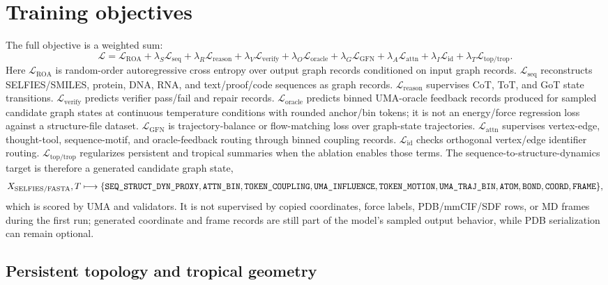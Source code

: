 \documentclass[11pt]{article}
\newcommand{\1}{\mathbf{1}}
\begin{document}
\section{Training objectives}

The full objective is a weighted sum:
\[
\mathcal L=\mathcal L_{\mathrm{ROA}}+
\lambda_S\mathcal L_{\mathrm{seq}}+
\lambda_R\mathcal L_{\mathrm{reason}}+
\lambda_V\mathcal L_{\mathrm{verify}}+
\lambda_O\mathcal L_{\mathrm{oracle}}+
\lambda_G\mathcal L_{\mathrm{GFN}}+
\lambda_A\mathcal L_{\mathrm{attn}}+
\lambda_I\mathcal L_{\mathrm{id}}+
\lambda_T\mathcal L_{\mathrm{top/trop}}.
\]
Here $\mathcal L_{\mathrm{ROA}}$ is random-order autoregressive cross entropy over output graph records conditioned on input graph records. $\mathcal L_{\mathrm{seq}}$ reconstructs SELFIES/SMILES, protein, DNA, RNA, and text/proof/code sequences as graph records. $\mathcal L_{\mathrm{reason}}$ supervises CoT, ToT, and GoT state transitions. $\mathcal L_{\mathrm{verify}}$ predicts verifier pass/fail and repair records. $\mathcal L_{\mathrm{oracle}}$ predicts binned UMA-oracle feedback records produced for sampled candidate graph states at continuous temperature conditions with rounded anchor/bin tokens; it is not an energy/force regression loss against a structure-file dataset. $\mathcal L_{\mathrm{GFN}}$ is trajectory-balance or flow-matching loss over graph-state trajectories. $\mathcal L_{\mathrm{attn}}$ supervises vertex-edge, thought-tool, sequence-motif, and oracle-feedback routing through binned coupling records. $\mathcal L_{\mathrm{id}}$ checks orthogonal vertex/edge identifier routing. $\mathcal L_{\mathrm{top/trop}}$ regularizes persistent and tropical summaries when the ablation enables those terms. The sequence-to-structure-dynamics target is therefore a generated candidate graph state,
\[
  X_{\rm SELFIES/FASTA},T \longmapsto
  \{\texttt{SEQ\_STRUCT\_DYN\_PROXY},\texttt{ATTN\_BIN},\texttt{TOKEN\_COUPLING},\texttt{UMA\_INFLUENCE},\texttt{TOKEN\_MOTION},\texttt{UMA\_TRAJ\_BIN},\texttt{ATOM},\texttt{BOND},\texttt{COORD},\texttt{FRAME}\},
\]
which is scored by UMA and validators. It is not supervised by copied coordinates, force labels, PDB/mmCIF/SDF rows, or MD frames during the first run; generated coordinate and frame records are still part of the model's sampled output behavior, while PDB serialization can remain optional.

\subsection{Persistent topology and tropical geometry}
\end{document}
